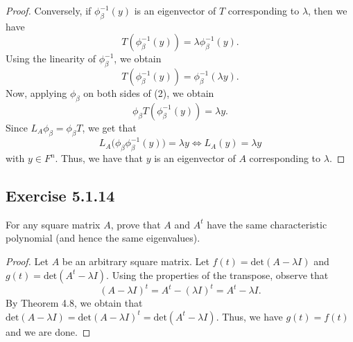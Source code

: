 \begin{enumerate}
\begin{proof}
        Conversely, if \( {\phi}_{\beta}^{-1}(y)  \) is an eigenvector of \( T  \) corresponding to \( \lambda  \), then we have
        \[  T({\phi}_{\beta}^{-1}(y)) = \lambda {\phi}_{\beta}^{-1}(y). \]
        Using the linearity of \( {\phi}_{\beta}^{-1} \), we obtain
        \[  T({\phi}_{\beta}^{-1}(y)) = {\phi}_{\beta}^{-1}(\lambda y). \tag{2} \]
        Now, applying \( {\phi}_{\beta} \) on both sides of (2), we obtain 
        \[  {\phi}_{\beta} T({\phi}_{\beta}^{-1}(y)) = \lambda y. \tag{3} \]
        Since \( {L}_{A} {\phi}_{\beta} = {\phi}_{\beta} T \), we get that
        \[ {L}_{A}\Big( {\phi}_{\beta} {\phi}_{\beta}^{-1}(y)  \Big) = \lambda y \iff {L}_{A}(y) = \lambda y  \]
        with \( y \in F^{n} \). Thus, we have that \( y  \) is an eigenvector of \( A  \) corresponding to \( \lambda  \).
        \end{proof}
\end{enumerate}

\subsection*{Exercise 5.1.14} For any square matrix \( A  \), prove that \( A  \) and \( A^{t} \) have the same characteristic polynomial (and hence the same eigenvalues).
\begin{proof}
Let \( A  \) be an arbitrary square matrix. Let \( f(t) = \text{det}(A - \lambda I ) \) and \( g(t) = \text{det}(A^{t} - \lambda I ) \). Using the properties of the transpose, observe that 
\[ (A - \lambda I )^{t} = A^{t} - (\lambda I )^{t} = A^{t} - \lambda I. \]
By Theorem 4.8, we obtain that \( \text{det}(A - \lambda I) = \text{det}(A - \lambda I )^{t} = \text{det}(A^{t} - \lambda I ) \). Thus, we have \( g(t) = f(t) \) and we are done.
\end{proof}


